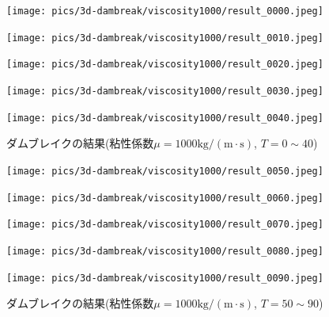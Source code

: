 \begin{figure}[H]
	\centering
	\begin{minipage}[b]{0.19\columnwidth}
	    \centering
	    \texttt{[image: pics/3d-dambreak/viscosity1000/result\_0000.jpeg]}
	\end{minipage}
	\begin{minipage}[b]{0.19\columnwidth}
	    \centering
	    \texttt{[image: pics/3d-dambreak/viscosity1000/result\_0010.jpeg]}
	\end{minipage}
	\begin{minipage}[b]{0.19\columnwidth}
	    \centering
	    \texttt{[image: pics/3d-dambreak/viscosity1000/result\_0020.jpeg]}
	\end{minipage}
	\begin{minipage}[b]{0.19\columnwidth}
	    \centering
	    \texttt{[image: pics/3d-dambreak/viscosity1000/result\_0030.jpeg]}
	\end{minipage}
	\begin{minipage}[b]{0.19\columnwidth}
	    \centering
	    \texttt{[image: pics/3d-dambreak/viscosity1000/result\_0040.jpeg]}
	\end{minipage}
	\caption{ダムブレイクの結果(粘性係数$\mu = 1000 \mathrm{kg/(m\cdot s)}$, $T=0 \sim 40$)}
	\label{fig:dambreak-result-visc1000-1}
\end{figure}

\begin{figure}[H]
	\centering
	\begin{minipage}[b]{0.19\columnwidth}
	    \centering
	    \texttt{[image: pics/3d-dambreak/viscosity1000/result\_0050.jpeg]}
	\end{minipage}
	\begin{minipage}[b]{0.19\columnwidth}
	    \centering
	    \texttt{[image: pics/3d-dambreak/viscosity1000/result\_0060.jpeg]}
	\end{minipage}
	\begin{minipage}[b]{0.19\columnwidth}
	    \centering
	    \texttt{[image: pics/3d-dambreak/viscosity1000/result\_0070.jpeg]}
	\end{minipage}
	\begin{minipage}[b]{0.19\columnwidth}
	    \centering
	    \texttt{[image: pics/3d-dambreak/viscosity1000/result\_0080.jpeg]}
	\end{minipage}
	\begin{minipage}[b]{0.19\columnwidth}
	    \centering
	    \texttt{[image: pics/3d-dambreak/viscosity1000/result\_0090.jpeg]}
	\end{minipage}
	\caption{ダムブレイクの結果(粘性係数$\mu = 1000 \mathrm{kg/(m\cdot s)}$, $T=50 \sim 90$)}
	\label{fig:dambreak-result-visc1000-2}
\end{figure}


